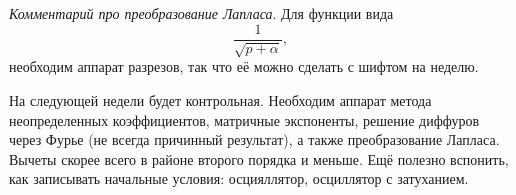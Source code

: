 \textit{Комментарий про преобразование Лапласа}. Для функции вида
\begin{equation*}
    \frac{1}{\sqrt{p+\alpha}},
\end{equation*}
необходим аппарат разрезов, так что её можно сделать с шифтом на неделю. 

На следующей недели будет контрольная. Необходим аппарат метода неопределенных коэффициентов, матричные экспоненты, решение диффуров через Фурье (не всегда причинный результат), а также преобразование Лапласа. Вычеты скорее всего в районе второго порядка и меньше.  Ещё полезно вспонить, как записывать начальные условия: осцияллятор, осциллятор с затуханием. 




